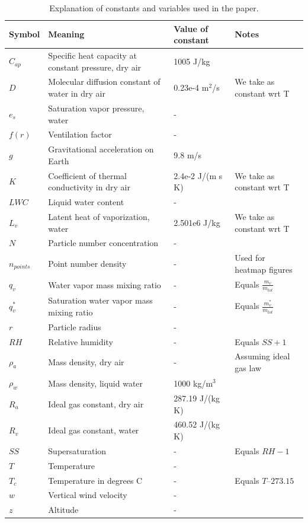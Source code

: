 \documentclass{article}
\begin{document}
\begin{table}
\centering
\begin{tabular}{@{}llll@{}}
\toprule
Symbol & Meaning & Value of constant & Notes \\ \midrule
$C_{ap}$ & Specific heat capacity at constant pressure, dry air & 1005 J/kg &  \\
$D$ & Molecular diffusion constant of water in dry air & 0.23e-4 m$^2$/s & We take as constant wrt T \\
$e_s$ & Saturation vapor pressure, water & - &  \\
$f(r)$ & Ventilation factor & - &  \\
$g$ & Gravitational acceleration on Earth & 9.8 m/s &  \\
$K$ & Coefficient of thermal conductivity in dry air & 2.4e-2 J/(m s K) & We take as constant wrt T \\
$LWC$ & Liquid water content & - &  \\
$L_v$ & Latent heat of vaporization, water & 2.501e6 J/kg & We take as constant wrt T \\
$N$ & Particle number concentration & - &  \\
$n_{points}$ & Point number density & - & Used for heatmap figures \\
$q_v$ & Water vapor mass mixing ratio & - & Equals $\frac{m_v}{m_{tot}}$ \\
$q_v^*$ & Saturation water vapor mass mixing ratio & - & Equals $\frac{m_v^*}{m_{tot}}$ \\
$r$ & Particle radius & - &  \\
$RH$ & Relative humidity & - & Equals $SS+1$ \\
$\rho_a$ & Mass density, dry air & - & Assuming ideal gas law \\
$\rho_w$ & Mass density, liquid water & 1000 kg/m$^3$ &  \\
$R_a$ & Ideal gas constant, dry air & 287.19 J/(kg K) &  \\
$R_v$ & Ideal gas constant, water & 460.52 J/(kg K) &  \\
$SS$ & Supersaturation & - & Equals $RH-1$ \\
$T$ & Temperature & - &  \\
$T_c$ & Temperature in degrees C & - & Equals $T – 273.15$ \\
$w$ & Vertical wind velocity & - &  \\
$z$ & Altitude & - &  \\ \bottomrule
\end{tabular}
\caption{Explanation of constants and variables used in the paper.}
\label{vartable}
\end{table}



\end{document}

